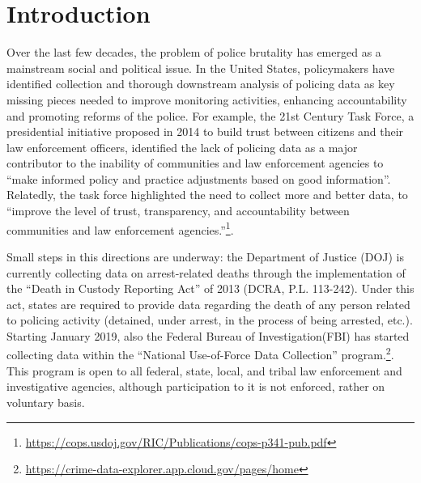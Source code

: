 

\section{Introduction} \label{sec:intro}



Over the last few decades, the problem of police brutality has emerged as a mainstream social and political issue. In the United States,  policymakers have identified collection and thorough downstream analysis of policing data as key missing pieces needed to improve monitoring activities, enhancing accountability and promoting reforms of the police. For example, the 21st Century Task Force, a presidential initiative proposed in 2014 to build trust between citizens and their law enforcement officers, identified the lack of policing data as a major contributor to the inability of communities and law enforcement agencies to ``make informed policy and practice adjustments based on good information''. Relatedly, the task force highlighted the need to collect more and better data, to ``improve the level of trust, transparency, and accountability between communities and law enforcement agencies.''\footnote{\url{https://cops.usdoj.gov/RIC/Publications/cops-p341-pub.pdf}}. 

Small steps in this directions are underway: the Department of Justice (DOJ) is currently collecting data on arrest-related deaths through the implementation of the ``Death in Custody Reporting Act'' of 2013 (DCRA, P.L. 113-242). Under this act, states are required to provide data regarding the death of any person related to policing activity (detained, under arrest, in the process of being arrested, etc.). Starting January 2019, also the Federal Bureau of Investigation(FBI) has started collecting data within the ``National Use-of-Force Data Collection'' program.\footnote{\url{https://crime-data-explorer.app.cloud.gov/pages/home}}. This program is open to all federal, state, local, and tribal law enforcement and investigative agencies, although participation to it is not enforced, rather on voluntary basis. 

